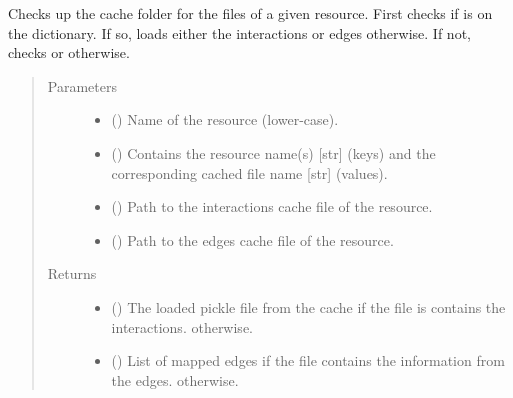 \documentclass[letterpaper,10pt,english]{sphinxmanual}
\begin{document}
\begin{fulllineitems}
\begin{fulllineitems}
\label{\detokenize{reference:pypath.main.PyPath.lookup_cache}}
Checks up the cache folder for the files of a given resource.
First checks if  is on the  dictionary.
If so, loads either the interactions or edges otherwise. If
not, checks  or  otherwise.
\begin{quote}\begin{description}
\item[{Parameters}] \leavevmode\begin{itemize}
\item {} 
 () \textendash{} Name of the resource (lower-case).

\item {} 
 () \textendash{} Contains the resource name(s) {[}str{]} (keys) and the
corresponding cached file name {[}str{]} (values).

\item {} 
 () \textendash{} Path to the interactions cache file of the resource.

\item {} 
 () \textendash{} Path to the edges cache file of the resource.

\end{itemize}

\item[{Returns}] \leavevmode
\begin{itemize}
\item {} 
() \textendash{} The loaded pickle file from the cache if the
file is contains the interactions.  otherwise.

\item {} 
() \textendash{} List of mapped edges if the file contains the
information from the edges. \sphinxcode{\sphinxupquote{{[}{]}}} otherwise.


\end{itemize}
\end{description}
\end{quote}
\end{fulllineitems}
\end{fulllineitems}
\end{document}
